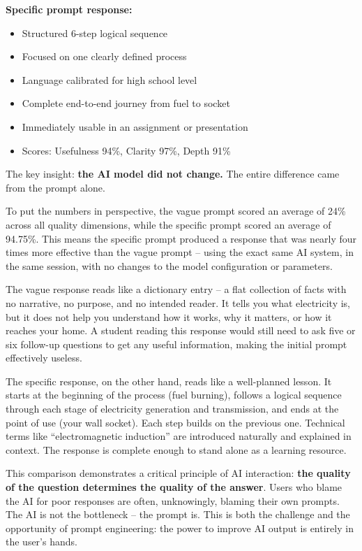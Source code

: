 \documentclass[12pt,a4paper]{article}
\begin{document}
\textbf{Specific prompt response:}
\begin{itemize}
  \item Structured 6-step logical sequence
  \item Focused on one clearly defined process
  \item Language calibrated for high school level
  \item Complete end-to-end journey from fuel to socket
  \item Immediately usable in an assignment or presentation
  \item Scores: Usefulness 94\%, Clarity 97\%, Depth 91\%
\end{itemize}

The key insight: \textbf{the AI model did not change.} The entire difference came from the prompt alone.

To put the numbers in perspective, the vague prompt scored an average of 24\% across all quality dimensions, while the specific prompt scored an average of 94.75\%. This means the specific prompt produced a response that was nearly four times more effective than the vague prompt -- using the exact same AI system, in the same session, with no changes to the model configuration or parameters.

The vague response reads like a dictionary entry -- a flat collection of facts with no narrative, no purpose, and no intended reader. It tells you what electricity is, but it does not help you understand how it works, why it matters, or how it reaches your home. A student reading this response would still need to ask five or six follow-up questions to get any useful information, making the initial prompt effectively useless.

The specific response, on the other hand, reads like a well-planned lesson. It starts at the beginning of the process (fuel burning), follows a logical sequence through each stage of electricity generation and transmission, and ends at the point of use (your wall socket). Each step builds on the previous one. Technical terms like ``electromagnetic induction'' are introduced naturally and explained in context. The response is complete enough to stand alone as a learning resource.

This comparison demonstrates a critical principle of AI interaction: \textbf{the quality of the question determines the quality of the answer}. Users who blame the AI for poor responses are often, unknowingly, blaming their own prompts. The AI is not the bottleneck -- the prompt is. This is both the challenge and the opportunity of prompt engineering: the power to improve AI output is entirely in the user's hands.
\end{document}
